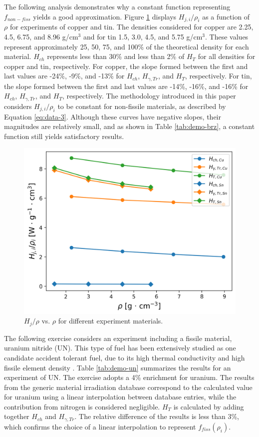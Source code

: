 The following analysis demonstrates why a constant function representing $f_{non-fiss}$ yields a good approximation.
Figure \ref{fig:H_rho1} displays $H_{j,i}/\rho_i$ as a function of $\rho$ for experiments of copper and tin.
The densities considered for copper are 2.25, 4.5, 6.75, and 8.96 g/cm$^3$ and for tin 1.5, 3.0, 4.5, and 5.75 g/cm$^3$.
These values represent approximately 25, 50, 75, and 100\% of the theoretical density for each material.
$H_{ch}$ represents less than 30\% and less than 2\% of $H_T$ for all densities for copper and tin, respectively.
For copper, the slope formed between the first and last values are -24\%, -9\%, and -13\% for $H_{ch}$, $H_{\gamma, Tr}$, and $H_{T}$, respectively.
For tin, the slope formed between the first and last values are -14\%, -16\%, and -16\% for $H_{ch}$, $H_{\gamma, Tr}$, and $H_{T}$, respectively.
The methodology introduced in this paper considers $H_{j,i}/\rho_i$ to be constant for non-fissile materials, as described by Equation \ref{eq:data-3}.
Although these curves have negative slopes, their magnitudes are relatively small, and as shown in Table \ref{tab:demo-brz}, a constant function still yields satisfactory results.

\begin{figure}[htbp!] %
    \centering
    \includegraphics[width=0.55\linewidth]{figures/toy-Cu_Sn_rho}
    \hfill
    \caption{$H_{j}/\rho$ vs. $\rho$ for different experiment materials.}
    \label{fig:H_rho1}
\end{figure}

The following exercise considers an experiment including a fissile material, uranium nitride (UN).
This type of fuel has been extensively studied as one candidate accident tolerant fuel, due to its high thermal conductivity and high fissile element density \cite{un}.
Table \ref{tab:demo-un} summarizes the results for an experiment of UN.
The exercise adopts a 4\% enrichment for uranium.
The results from the generic material irradiation database correspond to the calculated value for uranium using a linear interpolation between database entries, while the contribution from nitrogen is considered negligible.
$H_T$ is calculated by adding together $H_{ch}$ and $H_{\gamma,Tr}$.
The relative difference of the results is less than 3\%, which confirms the choice of a linear interpolation to represent $f_{fiss}(\rho_i)$.

